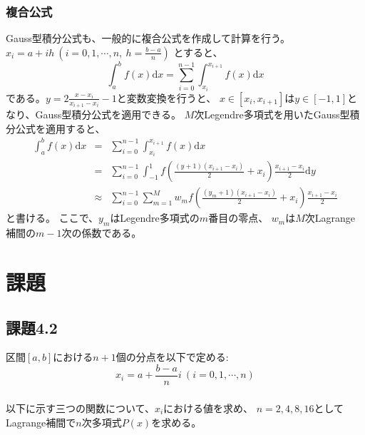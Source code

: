 \documentclass[a4j, titlepage]{jsarticle}
\numberwithin{equation}{section}
\begin{document}
        \subsubsection{複合公式}
            Gauss型積分公式も、一般的に複合公式を作成して計算を行う。
            $x_i=a+ih \ \left(i=0,1,\cdots,n, \ \displaystyle h=\frac{b-a}{n}\right)$
            とすると、
            \begin{equation*}
                \int_a^bf(x)\mathrm{d}x=\sum_{i=0}^{n-1}\int_{x_i}^{x_{i+1}}f(x)\mathrm{d}x
            \end{equation*}
            である。$\displaystyle y = 2\frac{x-x_i}{x_{i+1}-x_i}-1$と変数変換を行うと、
            $x\in[x_i,x_{i+1}]$は$y\in[-1,1]$となり、Gauss型積分公式を適用できる。
            $M$次Legendre多項式を用いたGauss型積分公式を適用すると、
            \begin{eqnarray}
                \int_a^bf(x)\mathrm{d}x &=& \sum_{i=0}^{n-1}\int_{x_i}^{x_{i+1}}f(x)\mathrm{d}x \nonumber \\
                &=& \sum_{i=0}^{n-1}\int_{-1}^{1}f\left(\frac{(y+1)(x_{i+1}-x_i)}{2}+x_i\right)\frac{x_{i+1}-x_i}{2}\mathrm{d}y \nonumber \\
                &\approx& \sum_{i=0}^{n-1}\sum_{m=1}^{M}w_mf\left(\frac{(y_m+1)(x_{i+1}-x_i)}{2}+x_i\right)\frac{x_{i+1}-x_i}{2} \label{equ:gauss}
            \end{eqnarray}
            と書ける。
            ここで、$y_m$はLegendre多項式の$m$番目の零点、
            $w_m$は$M$次Lagrange補間の$m-1$次の係数である。

\section{課題}
    \subsection{課題4.2}
        区間$[a,b]$における$n+1$個の分点を以下で定める:
        \begin{equation*}
            x_i = a + \frac{b-a}{n}i \ (i = 0, 1, \cdots, n)
        \end{equation*}

        \subsubsection{}
            以下に示す三つの関数について、$x_i$における値を求め、
            $n=2,4,8,16$としてLagrange補間で$n$次多項式$P(x)$を求める。
\end{document}
